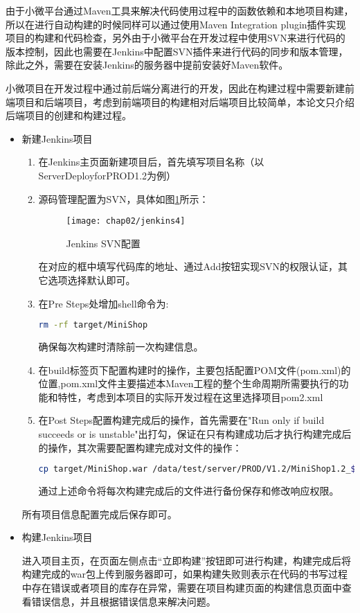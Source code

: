 由于小微平台通过Maven工具来解决代码使用过程中的函数依赖和本地项目构建\cite{董晓光2014使用}，所以在进行自动构建的时候同样可以通过使用Maven Integration plugin插件实现项目的构建和代码检查，另外由于小微平台在开发过程中使用SVN来进行代码的版本控制，因此也需要在Jenkins中配置SVN插件来进行代码的同步和版本管理，除此之外，需要在安装Jenkins的服务器中提前安装好Maven软件。

小微项目在开发过程中通过前后端分离进行的开发，因此在构建过程中需要新建前端项目和后端项目，考虑到前端项目的构建相对后端项目比较简单，本论文只介绍后端项目的创建和构建过程。
\begin{itemize}
  \item 新建Jenkins项目
  \begin{enumerate}
    \item 在Jenkins主页面新建项目后，首先填写项目名称（以ServerDeployforPROD1.2为例）
    \item 源码管理配置为SVN，具体如图\ref{fig:jenkins4}所示：
      \begin{figure}[H] %
        \centering
        \texttt{[image: chap02/jenkins4]}
        \caption{Jenkins SVN配置}
        \label{fig:jenkins4}
      \end{figure}
      在对应的框中填写代码库的地址、通过Add按钮实现SVN的权限认证，其它选项选择默认即可。
    \item 在Pre Steps处增加shell命令为:
\begin{lstlisting}[language=bash,numbers=none]
rm -rf target/MiniShop
\end{lstlisting}
      确保每次构建时清除前一次构建信息。
    \item 在build标签页下配置构建时的操作，主要包括配置POM文件(pom.xml)的位置,pom.xml文件主要描述本Maven工程的整个生命周期所需要执行的功能和特性\cite{mileva2009mining}，考虑到本项目的实际开发过程在这里选择项目pom2.xml
    \item 在Post Steps配置构建完成后的操作，首先需要在"Run only if build succeeds or is unstable"出打勾，保证在只有构建成功后才执行构建完成后的操作，其次需要配置构建完成对文件的操作：
\begin{lstlisting}[language=bash,numbers=none]
cp target/MiniShop.war /data/test/server/PROD/V1.2/MiniShop1.2_$(date +%Y%m%d)_$BUILD_NUMBER.war && chmod 777 /data/test/server/PROD/V1.2/MiniShop1.2_$(date +%Y%m%d)_$BUILD_NUMBER.war
\end{lstlisting}
      通过上述命令将每次构建完成后的文件进行备份保存和修改响应权限。
  \end{enumerate}
  所有项目信息配置完成后保存即可。
  \item 构建Jenkins项目

  进入项目主页，在页面左侧点击“立即构建”按钮即可进行构建，构建完成后将构建完成的war包上传到服务器即可，如果构建失败则表示在代码的书写过程中存在错误或者项目的库存在异常，需要在项目构建页面的构建信息页面中查看错误信息，并且根据错误信息来解决问题。
\end{itemize}

